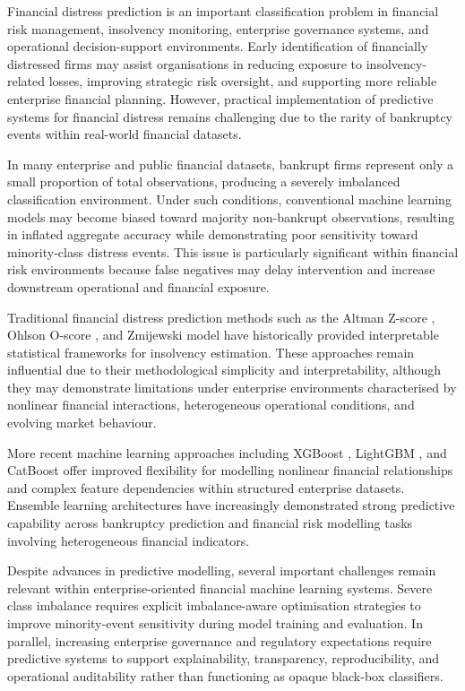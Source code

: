 \documentclass{article}
\begin{document}
Financial distress prediction is an important classification problem in financial risk management, insolvency monitoring, enterprise governance systems, and operational decision-support environments. Early identification of financially distressed firms may assist organisations in reducing exposure to insolvency-related losses, improving strategic risk oversight, and supporting more reliable enterprise financial planning. However, practical implementation of predictive systems for financial distress remains challenging due to the rarity of bankruptcy events within real-world financial datasets.

In many enterprise and public financial datasets, bankrupt firms represent only a small proportion of total observations, producing a severely imbalanced classification environment. Under such conditions, conventional machine learning models may become biased toward majority non-bankrupt observations, resulting in inflated aggregate accuracy while demonstrating poor sensitivity toward minority-class distress events. This issue is particularly significant within financial risk environments because false negatives may delay intervention and increase downstream operational and financial exposure.

Traditional financial distress prediction methods such as the Altman Z-score \cite{altman1968}, Ohlson O-score \cite{ohlson1980}, and Zmijewski model \cite{zmijewski1984} have historically provided interpretable statistical frameworks for insolvency estimation. These approaches remain influential due to their methodological simplicity and interpretability, although they may demonstrate limitations under enterprise environments characterised by nonlinear financial interactions, heterogeneous operational conditions, and evolving market behaviour.

More recent machine learning approaches including XGBoost \cite{chen2016xgboost}, LightGBM \cite{ke2017lightgbm}, and CatBoost \cite{prokhorenkova2018catboost} offer improved flexibility for modelling nonlinear financial relationships and complex feature dependencies within structured enterprise datasets. Ensemble learning architectures have increasingly demonstrated strong predictive capability across bankruptcy prediction and financial risk modelling tasks involving heterogeneous financial indicators.

Despite advances in predictive modelling, several important challenges remain relevant within enterprise-oriented financial machine learning systems. Severe class imbalance requires explicit imbalance-aware optimisation strategies to improve minority-event sensitivity during model training and evaluation. In parallel, increasing enterprise governance and regulatory expectations require predictive systems to support explainability, transparency, reproducibility, and operational auditability rather than functioning as opaque black-box classifiers.
\end{document}
